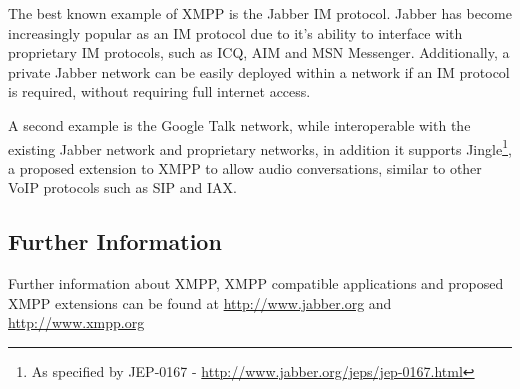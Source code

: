 The best known example of XMPP is the Jabber IM protocol. Jabber has
become increasingly popular as an IM protocol due to it's ability to
interface with proprietary IM protocols, such as ICQ, AIM and MSN
Messenger. Additionally, a private Jabber network can be easily 
deployed within a network if an IM protocol is required, without 
requiring full internet access. 


A second example is the Google Talk network, while interoperable with
the existing Jabber network and proprietary networks, in addition it
supports Jingle\footnote{As specified by JEP-0167 - \url{http://www.jabber.org/jeps/jep-0167.html}},
a proposed extension to XMPP to allow audio conversations, similar to
other VoIP protocols such as SIP and IAX.

\subsection{Further Information}

Further information about XMPP, XMPP compatible applications and
proposed XMPP extensions can be found at \url{http://www.jabber.org} and
\url{http://www.xmpp.org}
